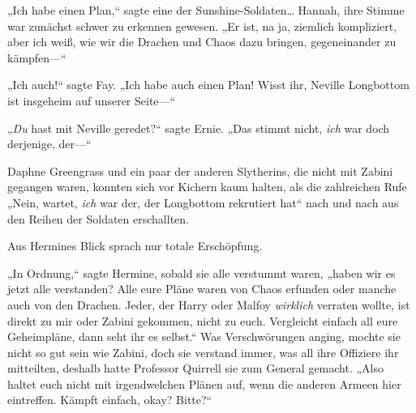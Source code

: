 „Ich habe einen Plan,“ sagte eine der Sunshine-Soldaten… Hannah, ihre Stimme war zunächst schwer zu erkennen gewesen. „Er ist, na ja, ziemlich kompliziert, aber ich weiß, wie wir die Drachen und Chaos dazu bringen, gegeneinander zu kämpfen—“

„Ich auch!“ sagte Fay. „Ich habe auch einen Plan! Wisst ihr, Neville Longbottom ist insgeheim auf unserer Seite—“

„\emph{Du} hast mit Neville geredet?“ sagte Ernie. „Das stimmt nicht, \emph{ich} war doch derjenige, der—“

Daphne Greengrass und ein paar der anderen Slytherins, die nicht mit Zabini gegangen waren, konnten sich vor Kichern kaum halten, als die zahlreichen Rufe „Nein, wartet, \emph{ich} war der, der Longbottom rekrutiert hat“ nach und nach aus den Reihen der Soldaten erschallten.

Aus Hermines Blick sprach nur totale Erschöpfung.

„In Ordnung,“ sagte Hermine, sobald sie alle verstummt waren, „haben wir es jetzt alle verstanden? Alle eure Pläne waren von Chaos erfunden oder manche auch von den Drachen. Jeder, der Harry oder Malfoy \emph{wirklich} verraten wollte, ist direkt zu mir oder Zabini gekommen, nicht zu euch. Vergleicht einfach all eure Geheimpläne, dann seht ihr es selbst.“ Was Verschwörungen anging, mochte sie nicht so gut sein wie Zabini, doch sie verstand immer, was all ihre Offiziere ihr mitteilten, deshalb hatte Professor Quirrell sie zum General gemacht. „Also haltet euch nicht mit irgendwelchen Plänen auf, wenn die anderen Armeen hier eintreffen. Kämpft einfach, okay? Bitte?“

